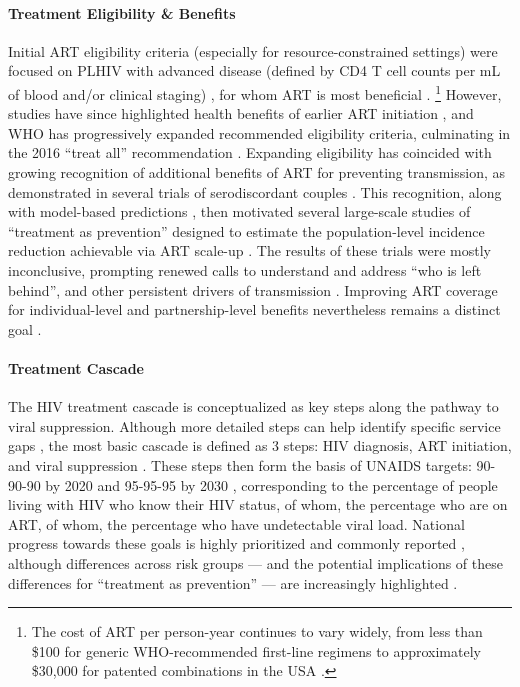 \paragraph{Treatment Eligibility \& Benefits}
Initial ART eligibility criteria (especially for resource-constrained settings)
were focused on PLHIV with advanced disease
(defined by CD4 T cell counts per mL of blood and/or clinical staging) \cite{WHO2003art},
for whom ART is most beneficial \cite{Gabillard2013,Maartens2014}.%
\footnote{The cost of ART per person-year continues to vary widely,
  from less than \$100 for generic WHO-recommended first-line regimens
  to approximately \$30,000 for patented combinations in the USA \cite{MSF2016ART}.}
However, studies have since highlighted health benefits of earlier ART initiation
\cite{Cohen2011art,Grinsztejn2014,Lundgren2015,Danel2015},
and WHO has progressively expanded recommended eligibility criteria,
culminating in the 2016 ``treat all'' recommendation
\cite{WHO2003art,WHO2007art,WHO2013art,WHO2016art}.
Expanding eligibility has coincided with growing recognition of
additional benefits of ART for preventing transmission,
as demonstrated in several trials of serodiscordant couples
\cite{Anglemyer2013,Cohen2016,Rodger2019}.
This recognition, along with model-based predictions \cite{Granich2009,Eaton2012},
then motivated several large-scale studies of ``treatment as prevention''
designed to estimate the population-level incidence reduction achievable via ART scale-up
\cite{Havlir2019,Hayes2019,Iwuji2018}.
The results of these trials were mostly inconclusive,
prompting renewed calls to understand and address ``who is left behind'',
and other persistent drivers of transmission \cite{Akullian2017,Eisinger2019tk,Baral2019,Havlir2020}.
Improving ART coverage for individual-level and partnership-level benefits
nevertheless remains a distinct goal \cite{959595}.
\paragraph{Treatment Cascade}
The HIV treatment cascade is conceptualized as key steps along the pathway to viral suppression.
Although more detailed steps can help identify specific service gaps \cite{Mountain2014exp},
the most basic cascade is defined as 3 steps:
HIV diagnosis, ART initiation, and viral suppression \cite{909090}.
These steps then form the basis of UNAIDS targets:
\mbox{90-90-90} by 2020 \cite{909090} and \mbox{95-95-95} by 2030 \cite{959595},
corresponding to the percentage of people living with HIV who know their HIV status,
of whom, the percentage who are on ART,
of whom, the percentage who have undetectable viral load.
National progress towards these goals is highly prioritized and commonly reported \cite{AIDSinfo},
although differences across risk groups
--- and the potential implications of these differences for ``treatment as prevention'' ---
are increasingly highlighted \cite{Akullian2017,Hakim2018,Green2020}.
